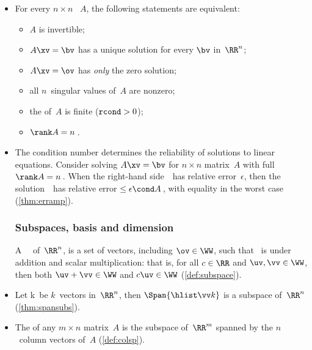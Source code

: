 \begin{itemize}
\itemme For every matrix~\(A\), let an \svd\ of~\(A\) be~\(\usv\), then the transpose~\(\tr A\) has an \svd\ of \(V(\tr S)\tr U\) (\autoref{thm:ranktr}). 
Further, \(\rank(\tr A)=\rank A\)\,.

\item For every \(n\times n\) ~\(A\), the following statements are equivalent: 
\begin{itemize}
\item \(A\) is {invertible};
\item \(A\xv=\bv\) has a {unique solution} for every \(\bv\) in~\(\RR^n\);
\item \(A\xv=\ov\) has \emph{only} the zero solution;
\item all \(n\)~{singular value}s of~\(A\) are nonzero;
\item the  of~\(A\) is finite (\(\verb|rcond|>0\));
\item \(\rank A=n\)\,.
\end{itemize}

\item The condition number determines the reliability of solutions to linear equations.
Consider solving \(A\xv=\bv\) for \(n\times n\) matrix~\(A\) with full \(\rank A=n\)\,.  
When the right-hand side~\bv\ has relative error~\(\epsilon\), then the solution~\xv\ has relative error\({}\leq\epsilon\cond A\)\,, with equality in the worst case (\autoref{thm:erramp}).





\subsubsection{Subspaces, basis and dimension}

\itemhi A ~\WW\ of~\(\RR^n\),  is a set of vectors, including \(\ov\in\WW\), such that \WW\ is  under addition and scalar multiplication: that is, for all \(c\in\RR\) and \(\uv,\vv\in\WW\), then both \(\uv+\vv\in\WW\) and \(c\uv\in\WW\) (\autoref{def:subspace}).

\item Let \hlist\vv k\ be \(k\)~vectors in~\(\RR^n\),
then \(\Span\{\hlist\vv k\}\) is a {subspace} of~\(\RR^n\) (\autoref{thm:spansubs}).

\item The  of any $m\times n$ matrix~$A$ is the {subspace} of~$\RR^m$ {span}ned by the \(n\)~{column vector}s of~$A$ (\autoref{def:colsp}).
        

\end{itemize}

